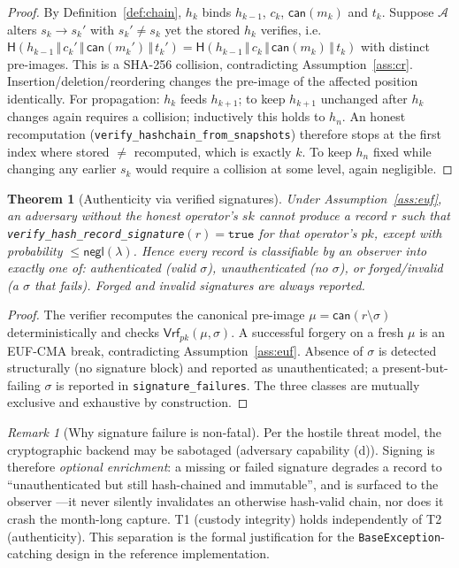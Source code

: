 \documentclass[11pt,a4paper]{article}
\theoremstyle{plain}
\newtheorem{theorem}{Theorem}
\theoremstyle{definition}
\theoremstyle{remark}
\newtheorem{remark}{Remark}
\newcommand{\Adv}{\mathcal{A}}
\newcommand{\negl}{\mathsf{negl}}
\newcommand{\Hash}{\mathsf{H}}
\newcommand{\Verify}{\mathsf{Vrf}}
\newcommand{\concat}{\,\Vert\,}
\newcommand{\code}[1]{\texttt{#1}}
\begin{document}
\begin{proof}
By Definition~\ref{def:chain}, $h_k$ binds $h_{k-1}$, $c_k$,
$\mathsf{can}(m_k)$ and $t_k$. Suppose $\Adv$ alters $s_k\to s_k'$ with
$s_k'\neq s_k$ yet the stored $h_k$ verifies, i.e.\
$\Hash(h_{k-1}\concat c_k'\concat \mathsf{can}(m_k')\concat t_k') =
\Hash(h_{k-1}\concat c_k\concat \mathsf{can}(m_k)\concat t_k)$ with
distinct pre-images. This is a SHA-256 collision, contradicting
Assumption~\ref{ass:cr}. Insertion/deletion/reordering changes the
pre-image of the affected position identically. For propagation: $h_{k}$
feeds $h_{k+1}$; to keep $h_{k+1}$ unchanged after $h_k$ changes again
requires a collision; inductively this holds to $h_n$. An honest
recomputation (\code{verify\_hashchain\_from\_snapshots}) therefore
stops at the first index where stored $\neq$ recomputed, which is
exactly $k$. To keep $h_n$ fixed while changing any earlier $s_k$ would
require a collision at some level, again negligible.
\end{proof}

\begin{theorem}[Authenticity via verified signatures]
\label{thm:t2}
Under Assumption~\ref{ass:euf}, an adversary without the honest
operator's $sk$ cannot produce a record $r$ such that
\code{verify\_hash\_record\_signature}$(r)=\mathtt{true}$ for that
operator's $pk$, except with probability $\le\negl(\lambda)$. Hence every
record is classifiable by an observer into exactly one of:
\emph{authenticated} (valid $\sigma$), \emph{unauthenticated} (no
$\sigma$), or \emph{forged/invalid} (a $\sigma$ that fails). Forged and
invalid signatures are always reported.
\end{theorem}

\begin{proof}
The verifier recomputes the canonical pre-image
$\mu=\mathsf{can}(r\setminus\sigma)$ deterministically and checks
$\Verify_{pk}(\mu,\sigma)$. A successful forgery on a fresh $\mu$ is an
EUF-CMA break, contradicting Assumption~\ref{ass:euf}. Absence of
$\sigma$ is detected structurally (no signature block) and reported as
unauthenticated; a present-but-failing $\sigma$ is reported in
\code{signature\_failures}. The three classes are mutually exclusive and
exhaustive by construction.
\end{proof}

\begin{remark}[Why signature failure is non-fatal]
Per the hostile threat model, the cryptographic backend may be sabotaged
(adversary capability (d)). Signing is therefore \emph{optional
enrichment}: a missing or failed signature degrades a record to
``unauthenticated but still hash-chained and immutable'', and is surfaced
to the observer ---it never silently invalidates an otherwise
hash-valid chain, nor does it crash the month-long capture. T1 (custody
integrity) holds independently of T2 (authenticity). This separation is
the formal justification for the \code{BaseException}-catching design in
the reference implementation.
\end{remark}
\end{document}
